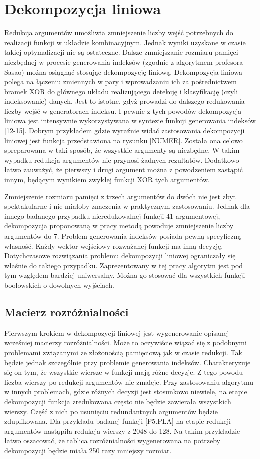 \chapter{Dekompozycja liniowa}

Redukcja argumentów umożliwia zmniejszenie liczby wejść potrzebnych do realizacji funkcji w układzie kombinacyjnym.
Jednak wyniki uzyskane w czasie takiej optymalizacji nie są ostateczne.
Dalsze zmniejszanie rozmiaru pamięci niezbędnej w procesie generowania indeksów (zgodnie z algorytmem profesora Sasao) można osiągnąć stosując dekompozycję liniową.
Dekompozycja liniowa polega na  łączeniu zmiennych w pary i wprowadzaniu ich za pośrednictwem bramek XOR do głównego układu realizującego detekcję i klasyfikację (czyli indeksowanie) danych.
Jest to istotne, gdyż prowadzi do dalszego redukowania liczby wejść w generatorach indeksu.
I pewnie z tych powodów dekompozycja liniowa jest intensywnie wykorzystywana w syntezie funkcji generowania indeksów [12-15].
Dobrym przykładem gdzie wyraźnie widać zastosowania dekompozycji liniowej jest funkcja przedstawiona na rysunku [NUMER].
Została ona celowo spreparowana w taki sposób, że wszystkie argumenty są niezbędne.
W takim wypadku redukcja argumentów nie przynosi żadnych rezultatów.
Dodatkowo łatwo zauważyć, że pierwszy i drugi argument można z powodzeniem zastąpić innym, będącym wynikiem zwykłej funkcji XOR tych argumentów.

Zmniejszenie rozmiaru pamięci z trzech argumentów do dwóch nie jest zbyt spektakularne i nie miałoby znaczenia w praktycznym zastosowaniu.
Jednak dla innego badanego przypadku nieredukowalnej funkcji 41 argumentowej, dekompozycja proponowaną w pracy metodą powoduje zmniejszenie liczby argumentów do 7.
Problem generowania indeksów posiada pewną specyficzną własność.
Każdy wektor wejściowy rozważanej funkcji ma inną decyzję.
Dotychczasowe rozwiązania problemu dekompozycji liniowej ograniczały się właśnie do takiego przypadku.
Zaprezentowany w tej pracy algorytm jest pod tym względem bardziej uniwersalny.
Można go stosować dla wszystkich funkcji boolowskich o dowolnych wyjściach.

\section{Macierz rozróżnialności}

Pierwszym krokiem w dekompozycji liniowej jest wygenerowanie opisanej wcześniej macierzy rozróżnialności.
Może to oczywiście wiązać się z podobnymi problemami związanymi ze złożonością pamięciową jak w czasie redukcji.
Tak będzie jednak szczególnie przy problemie generowania indeksów.
Charakteryzuje się on tym, że wszystkie wiersze w funkcji mają różne decyzje.
Z tego powodu liczba wierszy po redukcji argumentów nie zmaleje.
Przy zastosowaniu algorytmu w innych problemach, gdzie różnych decyzji jest stosunkowo niewiele, na etapie dekompozycji funkcja zredukowana często nie będzie zawierała wszystkich wierszy.
Część z nich po usunięciu redundantnych argumentów będzie zduplikowana.
Dla przykładu badanej funkcji [P5.PLA] na etapie redukcji argumentów nastąpiła redukcja wierszy z 2048 do 128.
Na takim przykładzie łatwo oszacować, że tablica rozróżnialności wygenerowana na potrzeby dekompozycji będzie miała 250 razy mniejszy rozmiar.

